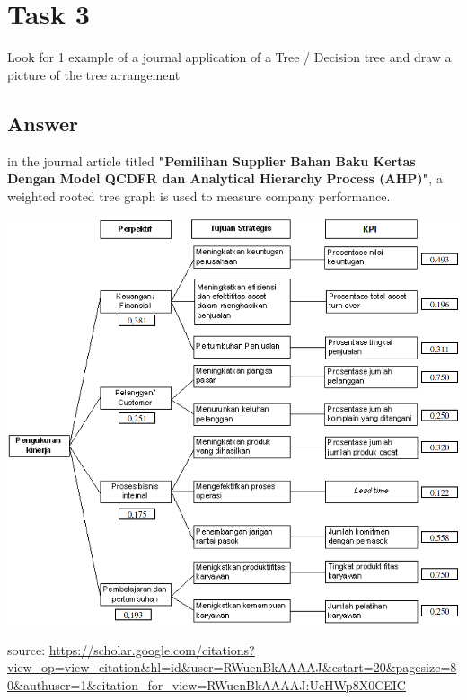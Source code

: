 \documentclass[12pt,titlepage]{article}
\begin{document}
\newpage

\section*{Task 3}
Look for 1 example of a journal application of a Tree / Decision tree and draw a picture of the tree arrangement 

\subsection*{Answer}
in the journal article titled \textbf{"Pemilihan Supplier Bahan Baku Kertas Dengan Model QCDFR dan Analytical Hierarchy Process (AHP)"}, a weighted rooted tree graph is used to measure company performance. 

\includegraphics[width=.9\textwidth]{images/figures/fig11.png}

source: \url{https://scholar.google.com/citations?view_op=view_citation&hl=id&user=RWuenBkAAAAJ&cstart=20&pagesize=80&authuser=1&citation_for_view=RWuenBkAAAAJ:UeHWp8X0CEIC}
\end{document}
